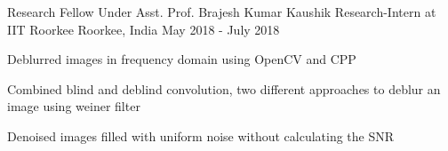 \begin{cventries}
  \cventry
    {Research Fellow Under Asst. Prof. Brajesh Kumar Kaushik }
    {Research-Intern at IIT Roorkee}
    {Roorkee, India}
    {May 2018 - July 2018}
    {
      \begin{cvitems}
        \item {Deblurred images in frequency domain using OpenCV and CPP}
        \item {Combined blind and deblind convolution, two different approaches to deblur an image using weiner filter }
        \item {Denoised images filled with uniform noise without calculating the SNR}
      \end{cvitems}
    }
  
\end{cventries}

